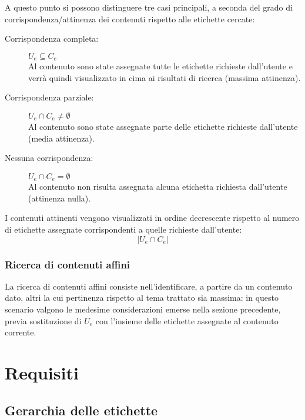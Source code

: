 \documentclass[10pt,a4paper,headinclude,footinclude,hidelinks]{scrreprt} %
\begin{document}
	A questo punto si possono distinguere tre casi principali, a seconda del grado di corrispondenza/attinenza dei contenuti rispetto alle etichette cercate:
	\begin{description}
	\item[Corrispondenza completa:] $U_e \subseteq C_e$ \hfill \\
	Al contenuto sono state assegnate tutte le etichette richieste dall'utente e verrà quindi visualizzato in cima ai risultati di ricerca (massima attinenza).
 	\item[Corrispondenza parziale:] $U_e \cap C_e \neq \emptyset$ \hfill \\
	Al contenuto sono state assegnate parte delle etichette richieste dall'utente (media attinenza).
	\item[Nessuna corrispondenza:] $U_e \cap C_e = \emptyset$\hfill \\
	Al contenuto non risulta assegnata alcuna etichetta richiesta dall'utente (attinenza nulla).
	\end{description}

	I contenuti attinenti vengono visualizzati in ordine decrescente rispetto al numero di etichette assegnate corrispondenti a quelle richieste dall'utente:
	$$\left|{U_e \cap C_e}\right|$$
	\subsection{Ricerca di contenuti affini}
	La ricerca di contenuti affini consiste nell'identificare, a partire da un contenuto dato, altri la cui pertinenza rispetto al tema trattato sia massima: in questo scenario valgono le medesime considerazioni emerse nella sezione precedente, previa sostituzione di $U_e$ con l'insieme delle etichette assegnate al contenuto corrente.
	
	\chapter{Requisiti}
	\label{ch:stage:cls:requisiti}
	\section{Gerarchia delle etichette}
	

\end{document}
